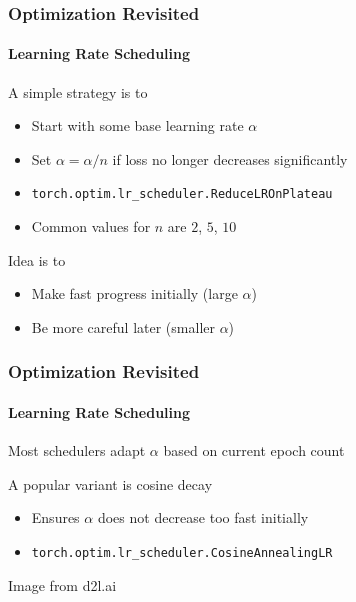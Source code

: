 \documentclass[xetex,professionalfont]{beamer}
\renewcommand\emph[1]{\textcolor{tuwcvl_cvl_blue}{#1}}
\begin{document}
\begin{frame}
  \frametitle{Optimization Revisited}
  \framesubtitle{Learning Rate Scheduling}
  
A simple strategy is to
\begin{itemize}
  \item Start with some base learning rate $\alpha$
  \item Set $\alpha=\alpha/n$ if loss no longer decreases significantly
  \item \texttt{torch.optim.lr\_scheduler.ReduceLROnPlateau}
  \item Common values for $n$ are $2$, $5$, $10$
\end{itemize}

\bigskip

Idea is to
\begin{itemize}
  \item Make fast progress initially (large $\alpha$)
  \item Be more careful later (smaller $\alpha$) %
\end{itemize}
  
\end{frame}


  \begin{frame}
    \frametitle{Optimization Revisited}
    \framesubtitle{Learning Rate Scheduling}
    
  Most schedulers adapt $\alpha$ based on current epoch count

  \bigskip
  A popular variant is \emph{cosine decay} %
  \begin{itemize}
    \item Ensures $\alpha$ does not decrease too fast initially
    \item \texttt{torch.optim.lr\_scheduler.CosineAnnealingLR}
  \end{itemize}
  
  \medskip
  
\begin{center}
  {\centering Image from d2l.ai} %
\end{center}
    
\end{frame}
\end{document}
